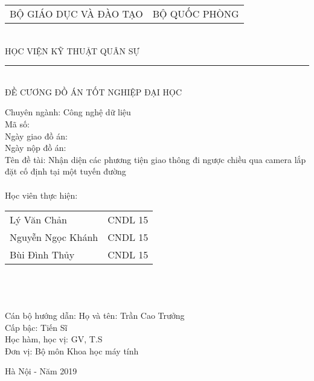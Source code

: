 \begin{center}
\vfill
\begin{tabular*}{0.8\linewidth}{@{\extracolsep{\fill}}cc}
	\large BỘ GIÁO DỤC VÀ ĐÀO TẠO  & \large BỘ QUỐC PHÒNG \\
\end{tabular*}
\\
\large HỌC VIỆN KỸ THUẬT QUÂN SỰ
\\
\rule{200px}{1px}\\
ĐỀ CƯƠNG ĐỒ ÁN TỐT NGHIỆP ĐẠI HỌC \\

\end{center}
\vfill
Chuyên ngành: Công nghệ dữ liệu\\
Mã số:\\
Ngày giao đồ án:\\
Ngày nộp đồ án:\\
Tên đề tài: Nhận diện các phương tiện giao thông đi ngược chiều qua camera lắp đặt cố định tại một tuyến đường\\ \\
Học viên thực hiện:
\smallbreak
\begin{tabularx}{\linewidth}{l l}
	 Lý Văn Chản  & CNDL 15\\
	 Nguyễn Ngọc Khánh  & CNDL 15\\
	 Bùi Đình Thủy  &  CNDL 15\\
\end{tabularx}\\\\\\
Cán bộ hướng dẫn:
Họ và tên: Trần Cao Trưởng\\
Cấp bậc: Tiến Sĩ\\
Học hàm, học vị: GV, T.S\\
Đơn vị: Bộ môn Khoa học máy tính

\vfill
\begin{center}
Hà Nội - Năm 2019
\end{center}

\thispagestyle{empty}